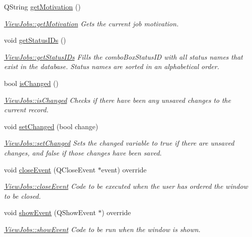 \begin{DoxyCompactItemize}
Q\+String \hyperlink{class_view_jobs_a238ec5365ef2c39baa97670769dfedca}{get\+Motivation} ()
\begin{DoxyCompactList}\small\item\em \hyperlink{class_view_jobs_a238ec5365ef2c39baa97670769dfedca}{View\+Jobs\+::get\+Motivation} Gets the current job motivation. \end{DoxyCompactList}\item 
\mbox{\label{class_view_jobs_adabe196e81c74d17c436de1a6ea12099}} 
void \hyperlink{class_view_jobs_adabe196e81c74d17c436de1a6ea12099}{get\+Status\+I\+Ds} ()
\begin{DoxyCompactList}\small\item\em \hyperlink{class_view_jobs_adabe196e81c74d17c436de1a6ea12099}{View\+Jobs\+::get\+Status\+I\+Ds} Fills the combo\+Box\+Status\+ID with all status names that exist in the database. Status names are sorted in an alphabetical order. \end{DoxyCompactList}\item 
bool \hyperlink{class_view_jobs_a5f75b45d28ce7f4a8050ce9ce0f44350}{is\+Changed} ()
\begin{DoxyCompactList}\small\item\em \hyperlink{class_view_jobs_a5f75b45d28ce7f4a8050ce9ce0f44350}{View\+Jobs\+::is\+Changed} Checks if there have been any unsaved changes to the current record. \end{DoxyCompactList}\item 
void \hyperlink{class_view_jobs_a3cba868c6deadaf4b35c18982f7ec35e}{set\+Changed} (bool change)
\begin{DoxyCompactList}\small\item\em \hyperlink{class_view_jobs_a3cba868c6deadaf4b35c18982f7ec35e}{View\+Jobs\+::set\+Changed} Sets the changed variable to true if there are unsaved changes, and false if those changes have been saved. \end{DoxyCompactList}\item 
void \hyperlink{class_view_jobs_a832503ca9eb4e4bf79c2fb48a59141aa}{close\+Event} (Q\+Close\+Event $\ast$event) override
\begin{DoxyCompactList}\small\item\em \hyperlink{class_view_jobs_a832503ca9eb4e4bf79c2fb48a59141aa}{View\+Jobs\+::close\+Event} Code to be executed when the user has ordered the window to be closed. \end{DoxyCompactList}\item 
\mbox{\label{class_view_jobs_a50f3a52f43e097d46e106e0aa31e9eb4}} 
void \hyperlink{class_view_jobs_a50f3a52f43e097d46e106e0aa31e9eb4}{show\+Event} (Q\+Show\+Event $\ast$) override
\begin{DoxyCompactList}\small\item\em \hyperlink{class_view_jobs_a50f3a52f43e097d46e106e0aa31e9eb4}{View\+Jobs\+::show\+Event} Code to be run when the window is shown. \end{DoxyCompactList}\end{DoxyCompactItemize}


